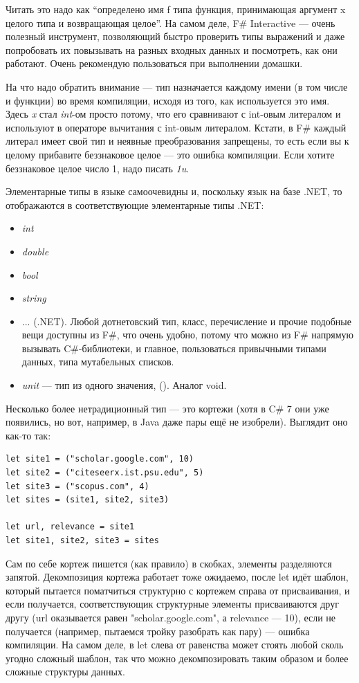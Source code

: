 \documentclass[a5paper]{article}
\begin{document}
Читать это надо как ``определено имя f типа функция, принимающая аргумент x целого типа и возвращающая целое''. На самом деле, F\# Interactive --- очень полезный инструмент, позволяющий быстро проверить типы выражений и даже попробовать их повызывать на разных входных данных и посмотреть, как они работают. Очень рекомендую пользоваться при выполнении домашки.

На что надо обратить внимание --- тип назначается каждому имени (в том числе и функции) во время компиляции, исходя из того, как используется это имя. Здесь \textit{x} стал \textit{int}-ом просто потому, что его сравнивают с int-овым литералом и используют в операторе вычитания с int-овым литералом. Кстати, в F\# каждый литерал имеет свой тип и неявные преобразования запрещены, то есть если вы к целому прибавите беззнаковое целое --- это ошибка компиляции. Если хотите беззнаковое целое число 1, надо писать \textit{1u}.

Элементарные типы в языке самоочевидны и, поскольку язык на базе .NET, то отображаются в соответствующие элементарные типы .NET:

\begin{itemize}
	\item \textit{int}
	\item \textit{double}
	\item \textit{bool}
	\item \textit{string}
	\item ... (.NET). Любой дотнетовский тип, класс, перечисление и прочие подобные вещи доступны из F\#, что очень удобно, потому что можно из F\# напрямую вызывать C\#-библиотеки, и главное, пользоваться привычными типами данных, типа мутабельных списков.
	\item \textit{unit} --- тип из одного значения, (). Аналог void.
\end{itemize}

Несколько более нетрадиционный тип --- это кортежи (хотя в C\# 7 они уже появились, но вот, например, в Java даже пары ещё не изобрели). Выглядит оно как-то так:

\begin{verbatim}
let site1 = ("scholar.google.com", 10)
let site2 = ("citeseerx.ist.psu.edu", 5)
let site3 = ("scopus.com", 4)
let sites = (site1, site2, site3)

let url, relevance = site1
let site1, site2, site3 = sites
\end{verbatim}

Сам по себе кортеж пишется (как правило) в скобках, элементы разделяются запятой. Декомпозиция кортежа работает тоже ожидаемо, после let идёт шаблон, который пытается поматчиться структурно с кортежем справа от присваивания, и если получается, соответствующик структурные элементы присваиваются друг другу (url оказывается равен "scholar.google.com", а relevance --- 10), если не получается (например, пытаемся тройку разобрать как пару) --- ошибка компиляции. На самом деле, в let слева от равенства может стоять любой сколь угодно сложный шаблон, так что можно декомпозировать таким образом и более сложные структуры данных.
\end{document}
